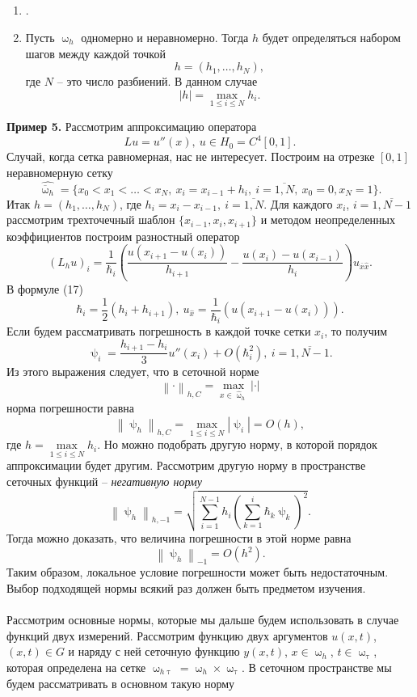 \documentclass[a4paper, 12pt]{report}
\numberwithin{equation}{section}
\newcommand{\ol}{\overline}
\renewcommand{\leq}{\leqslant}
\renewcommand{\tau}{\uptau}
\renewcommand{\psi}{\uppsi}
\renewcommand{\omega}{\upomega}
\newcommand\Norm[1]{\left\| #1 \right\|}
\begin{document}
		\subsection{}
		
		\begin{enumerate}
			\item .
			\item Пусть $\omega_h$ одномерно и неравномерно. Тогда $h$ будет определяться набором шагов между каждой точкой $$h = (h_1,\ldots, h_N),$$ где $N$ -- это число разбиений. В данном случае $$|h| = \underset{1\leq i \leq N}{\max}h_i.$$
		\end{enumerate}
		\textbf{Пример 5.} Рассмотрим аппроксимацию оператора $$Lu = u''(x),\ u\in H_0 = C^4[0,1].$$
		Случай, когда сетка равномерная, нас не интересует. Построим на отрезке $[0,1]$ неравномерную сетку $$\hat{\ol \omega_h} = \{x_0 < x_1 < \ldots < x_N,\ x_i = x_{i-1}+h_{i},\ i=\ol{1,N},\ x_0=0, x_N=1\}.$$
		Итак $h = (h_1,\ldots, h_N)$, где $h_i = x_i - x_{i-1},\ i=\ol{1,N}.$ Для каждого $x_i$, $i=\ol {1, N-1}$ рассмотрим трехточечный шаблон $\{x_{i-1}, x_i, x_{i+1}\}$ и методом неопределенных коэффициентов построим разностный оператор \begin{equation}
			(L_hu)_i = \dfrac{1}{ \hbar_i}\left(\dfrac{u(x_{i+1} - u(x_i))}{h_{i+1}} - \dfrac{u(x_i) - u(x_{i-1})}{h_i}\right)u_{\ol x \hat x}.
		\end{equation}
		В формуле (17) $$\hbar_i = \dfrac12 (h_i + h_{i+1}),\ u_{\hat x}=\dfrac{1}{\hbar_i}(u(x_{i+1} - u(x_i))).$$
		Если будем рассматривать погрешность в каждой точке сетки $x_i$, то получим
		$$\psi_i = \dfrac{h_{i+1} - h_i}{3}u''(x_i) + O(\hbar_i^2),\ i = \ol{1, N-1}.$$
		Из этого выражения следует, что в сеточной норме $$\Norm{\cdot}_{h, C} = \underset{x \in \hat \omega_h}{\max}|\cdot |$$
		норма погрешности равна
		$$\Norm{\psi_h}_{h,C} = \underset{1\leq i \leq N}{\max}|\psi_i|=O(h),$$
		где $h = \underset{1\leq i \leq N}{\max}h_i.$
		Но можно подобрать другую норму, в которой порядок аппроксимации будет другим. Рассмотрим другую норму в пространстве сеточных функций -- \textit{негативную норму}
		$$\Norm{\psi_h}_{h, -1}=\sqrt{\sum_{i=1}^{N-1}h_i\left(\sum_{k=1}^i \hbar_k \psi_k\right)^2}.$$
		Тогда можно доказать, что величина погрешности в этой норме равна
		$$\Norm{\psi_h}_{-1} = O(h^2).$$
		Таким образом, локальное условие погрешности может быть недостаточным.
		Выбор подходящей нормы всякий раз должен быть предметом изучения. \\\\
		Рассмотрим основные нормы, которые мы дальше будем использовать в случае функций двух измерений. Рассмотрим функцию двух аргументов $u(x,t)$, $(x,t) \in G$ и наряду с ней сеточную функцию $y(x,t)$, $x \in \omega_h$, $t \in \omega_\tau$, которая определена на сетке $\omega_{h\tau} = \omega_h \times \omega_\tau$. В сеточном пространстве мы будем рассматривать в основном такую норму 
\end{document}
